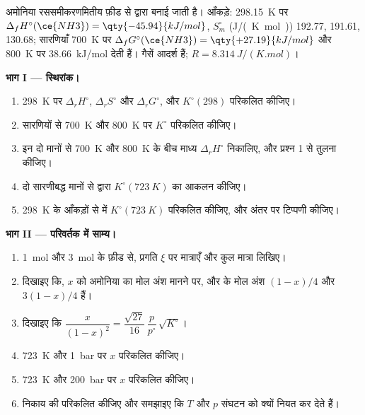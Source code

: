\begin{problem}
\label{pb:b2:equilibrium-shifts:1}
अमोनिया रससमीकरणमितीय फ़ीड से  द्वारा बनाई जाती है।
आँकड़े: \qty{298.15}{K} पर $\Delta_f H^\circ(\ce{NH3}) = \qty{-45.94}{kJ/mol}$,
$S^\circ_m$ (\unit{J/(K.mol)})  192.77,  191.61,  130.68;
सारणियाँ \qty{700}{K} पर $\Delta_f G^\circ(\ce{NH3}) = \qty{+27.19}{kJ/mol}$ और
\qty{800}{K} पर \qty{+38.66}{kJ/mol} देती हैं। गैसें आदर्श हैं;
$R = \qty{8.314}{J/(K.mol)}$।

\medskip
\noindent\textbf{भाग I --- स्थिरांक।}
\begin{enumerate}
  \item \qty{298}{K} पर $\Delta_r H^\circ$, $\Delta_r S^\circ$ और $\Delta_r G^\circ$,
        और $K^\circ(298)$ परिकलित कीजिए।
  \item सारणियों से \qty{700}{K} और \qty{800}{K} पर $K^\circ$ परिकलित कीजिए।
  \item इन दो मानों से \qty{700}{K} और \qty{800}{K} के बीच माध्य $\Delta_r H^\circ$
        निकालिए, और प्रश्न 1 से तुलना कीजिए।
  \item दो सारणीबद्ध मानों से  द्वारा $K^\circ(\qty{723}{K})$ का
        आकलन कीजिए।
  \item \qty{298}{K} के आँकड़ों से  में $K^\circ(\qty{723}{K})$
        परिकलित कीजिए, और अंतर पर टिप्पणी कीजिए।
\end{enumerate}

\medskip
\noindent\textbf{भाग II --- परिवर्तक में साम्य।}
\begin{enumerate}[resume]
  \item \qty{1}{mol}  और \qty{3}{mol}  के फ़ीड से, प्रगति $\xi$ पर
        मात्राएँ और कुल मात्रा लिखिए।
  \item दिखाइए कि, $x$ को अमोनिया का मोल अंश मानने पर,  और  के मोल अंश
        $(1-x)/4$ और $3(1-x)/4$ हैं।
  \item दिखाइए कि $\dfrac{x}{(1-x)^2} = \dfrac{\sqrt{27}}{16}\,\dfrac{p}{p^\circ}\,
        \sqrt{K^\circ}$।
  \item \qty{723}{K} और \qty{1}{bar} पर $x$ परिकलित कीजिए।
  \item \qty{723}{K} और \qty{200}{bar} पर $x$ परिकलित कीजिए।
  \item निकाय की  परिकलित कीजिए और समझाइए कि $T$ और $p$
        संघटन को क्यों नियत कर देते हैं।
\end{enumerate}


\end{problem}
